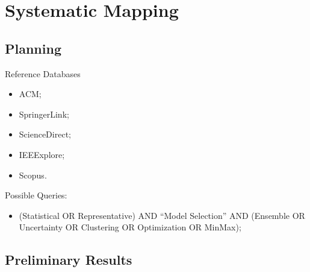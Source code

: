 \documentclass{beamer}
\begin{document}
\section{Systematic Mapping}
\subsection{Planning}
\begin{frame}{Reference Databases}
  \begin{itemize}
  \item ACM;
  \item SpringerLink;
  \item ScienceDirect;
  \item IEEExplore;
  \item Scopus.
  \end{itemize}
\end{frame}

\begin{frame}
  Possible Queries:
  \begin{itemize}
    \item (Statistical OR Representative) AND ``Model Selection'' AND (Ensemble OR Uncertainty OR Clustering OR Optimization OR MinMax);
  \end{itemize}
\end{frame}

\subsection{Preliminary Results}
\end{document}
